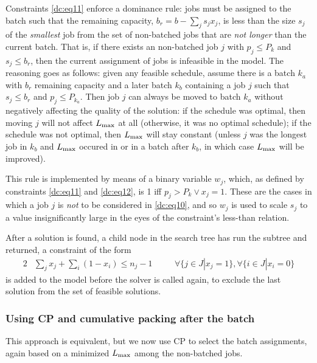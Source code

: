 Constraints \eqref{dc:eq11} enforce a dominance rule: jobs must be assigned to
the batch such that the remaining capacity, $b_r = b - \sum_j s_j x_j$, is less than
the size $s_j$ of the \textit{smallest} job from the set of non-batched jobs that
are \textit{not longer} than the current batch. That is, if there exists an
non-batched job $j$ with $p_j \leq P_k$ and $s_j \leq b_r$, then the current
assignment of jobs is infeasible in the model. The reasoning goes as follows:
given any feasible schedule, assume there is a batch $k_a$ with $b_r$ remaining capacity
and a later batch $k_b$ containing a job $j$ such that $s_j \leq b_r$ and $p_j \leq
P_{k_a}$. Then job $j$ can always be moved to batch $k_a$ without negatively affecting the
quality of the solution: if the schedule was optimal, then moving $j$ will not
affect $L_{\text{max}}$ at all (otherwise, it was no optimal schedule); if the schedule
was not optimal, then $L_{\text{max}}$ will stay constant (unless $j$ was the longest job
in $k_b$ and $L_{\text{max}}$ occured in or in a batch after $k_b$, in which case $L_{\text{max}}$ will
be improved).

This rule is implemented by means of a binary variable $w_j$, which, as defined
by constraints \eqref{dc:eq11} and \eqref{dc:eq12}, is 1 iff $p_j > P_k \lor x_j
= 1$. These are the cases in which a job $j$ is \textit{not} to be considered in \eqref{dc:eq10}, and so $w_j$ is used to scale $s_j$ to a value
insignificantly large in the eyes of the constraint's less-than relation.

After a solution is found, a child node in the search tree has run the subtree
and returned, a constraint of the form 
\begin{alignat}{2}
& \sum_j x_j + \sum_i (1-x_i) \leq n_j - 1 \quad && \forall \{j \in J | x_j =
1\}, \forall \{i \in J | x_i = 0 \}
\end{alignat}
is added to the model before the solver is called again, to exclude the last
solution from the set of feasible solutions. 

\subsubsection{Using CP and cumulative packing after the batch}
This approach is equivalent, but we now use CP to select the batch assignments,
again based on a minimized $L_{\text{max}}$ among the non-batched jobs. 

